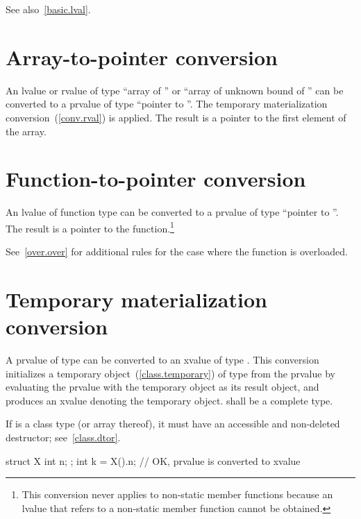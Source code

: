 \pnum
\begin{note}
See also~\ref{basic.lval}.\end{note}

\section[conv.array]{Array-to-pointer conversion}

\pnum
{}%
%
%
An lvalue or rvalue of type ``array of  '' or ``array
of unknown bound of '' can be converted to a prvalue of type
``pointer to ''.
The temporary materialization conversion~(\ref{conv.rval}) is applied.
The result is a pointer to the first element of the array.

\section[conv.func]{Function-to-pointer conversion}

\pnum
{}%
An lvalue of function type  can be converted to a prvalue of
type ``pointer to ''. The result is a pointer to the
function.\footnote{This conversion never applies to non-static member functions because an
lvalue that refers to a non-static member function cannot be obtained.}

\pnum
\begin{note}
See~\ref{over.over} for additional rules for the case where the function
is overloaded.
\end{note}

\section[conv.rval]{Temporary materialization conversion}
%

\pnum
A prvalue of type  can be converted to an xvalue of type .
This conversion initializes a temporary object~(\ref{class.temporary}) of type  from the prvalue
by evaluating the prvalue with the temporary object as its result object,
and produces an xvalue denoting the temporary object.
 shall be a complete type.
\begin{note}
If  is a class type (or array thereof),
it must have an accessible and non-deleted destructor;
see~\ref{class.dtor}.
\end{note}
\begin{example}
\begin{codeblock}
struct X { int n; };
int k = X().n;      // OK,  prvalue is converted to xvalue
\end{codeblock}
\end{example}

